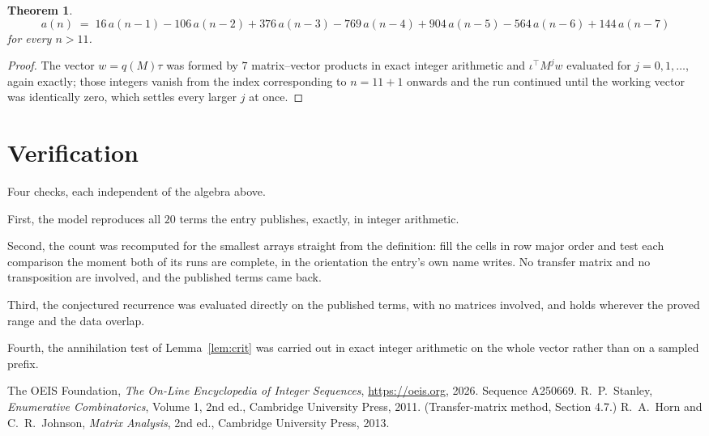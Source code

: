 \documentclass[11pt,a4paper]{article}
\theoremstyle{plain}
\newtheorem{theorem}{Theorem}
\theoremstyle{definition}
\begin{document}
\begin{theorem}
\[
a(n)\;=\;16\,a(n-1) - 106\,a(n-2) + 376\,a(n-3) - 769\,a(n-4) + 904\,a(n-5) - 564\,a(n-6) + 144\,a(n-7)
\]
for every $n>11$.
\end{theorem}

\begin{proof}
The vector $w=q(M)\tau$ was formed by $7$ matrix--vector products in exact integer
arithmetic and $\iota^{\!\top}M^{j}w$ evaluated for $j=0,1,\dots$, again exactly; those
integers vanish from the index corresponding to $n=11+1$ onwards and the run continued
until the working vector was identically zero, which settles every larger $j$ at once.
\end{proof}

\section{Verification}

Four checks, each independent of the algebra above.

First, the model reproduces all $20$ terms the entry publishes, exactly, in integer
arithmetic.

Second, the count was recomputed for the smallest arrays straight from the definition: fill the
cells in row major order and test each comparison the moment both of its runs are complete,
in the orientation the entry's own name writes. No transfer matrix and no transposition are
involved, and the published terms came back.

Third, the conjectured recurrence was evaluated directly on the published terms, with no
matrices involved, and holds wherever the proved range and the data overlap.

Fourth, the annihilation test of Lemma~\ref{lem:crit} was carried out in exact integer
arithmetic on the whole vector rather than on a sampled prefix.

\begin{thebibliography}{9}
 The OEIS Foundation, \emph{The On-Line Encyclopedia of Integer
Sequences}, \url{https://oeis.org}, 2026. Sequence A250669.
 R.~P.~Stanley, \emph{Enumerative Combinatorics}, Volume 1, 2nd ed.,
Cambridge University Press, 2011. (Transfer-matrix method, Section 4.7.)
 R.~A.~Horn and C.~R.~Johnson, \emph{Matrix Analysis}, 2nd ed., Cambridge
University Press, 2013.
\end{thebibliography}
\end{document}
